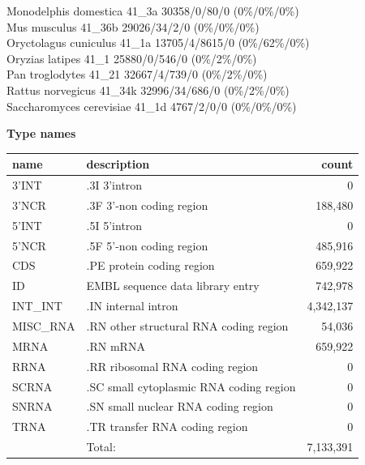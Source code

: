 \documentclass{article}
\begin{document}
\begin{Schunk}
Monodelphis domestica                   41\_3a 30358/0/80/0 (0\%/0\%/0\%)\\
Mus musculus                            41\_36b 29026/34/2/0 (0\%/0\%/0\%)\\
Oryctolagus cuniculus                   41\_1a 13705/4/8615/0 (0\%/62\%/0\%)\\
Oryzias latipes                         41\_1 25880/0/546/0 (0\%/2\%/0\%)\\
Pan troglodytes                         41\_21 32667/4/739/0 (0\%/2\%/0\%)\\
Rattus norvegicus                       41\_34k 32996/34/686/0 (0\%/2\%/0\%)\\
Saccharomyces cerevisiae                41\_1d 4767/2/0/0 (0\%/0\%/0\%)

\textbf{Type names}
\noindent\begin{tabular}{llr}
\hline \hline
name & description & count \\
\hline
3'INT  &  .3I 3'intron  &  0 \\
3'NCR  &  .3F  3'-non coding region  &  188,480 \\
5'INT  &  .5I 5'intron  &  0 \\
5'NCR  &  .5F  5'-non coding region  &  485,916 \\
CDS  &  .PE protein coding region  &  659,922 \\
ID  &  EMBL sequence data library entry  &  742,978 \\
INT\_INT  &  .IN  internal intron  &  4,342,137 \\
MISC\_RNA  &  .RN other structural RNA coding region  &  54,036 \\
MRNA  &  .RN mRNA  &  659,922 \\
RRNA  &  .RR ribosomal RNA coding region  &  0 \\
SCRNA  &  .SC small cytoplasmic RNA coding region  &  0 \\
SNRNA  &  .SN small nuclear RNA coding region  &  0 \\
TRNA  &  .TR transfer RNA coding region  &  0 \\
\hline
 & Total: & 7,133,391 \\
\hline \hline
\end{tabular}


\end{Schunk}
\end{document}
